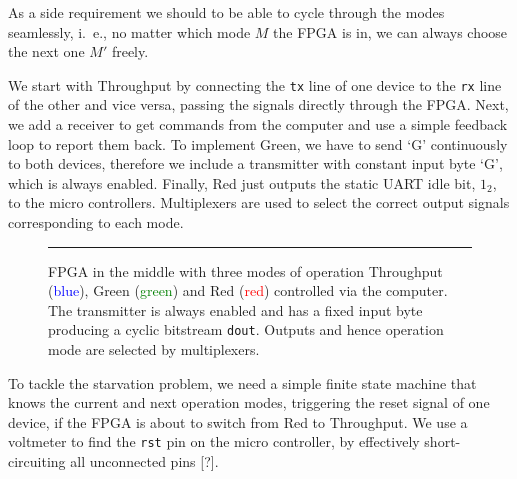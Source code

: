 As a side requirement we should to be able to cycle through the modes seamlessly, i.~e., no matter which mode $M$ the FPGA is in, we can always choose the next one $M'$ freely.

We start with \textsf{Throughput} by connecting the \texttt{tx} line of one device to the \texttt{rx} line of the other and vice versa, passing the signals directly through the FPGA. 
Next, we add a receiver to get commands from the computer and use a simple feedback loop to report them back. 
To implement \textsf{Green}, we have to send `G' continuously to both devices, therefore we include a transmitter with constant input byte `G', which is always enabled.
Finally, \textsf{Red} just outputs the static UART idle bit, $1_2$, to the micro controllers. 
Multiplexers are used to select the correct output signals corresponding to each mode. 

\begin{figure}[tb]
    \begin{center}
        
        \caption{FPGA in the middle with three modes of operation \textsf{Throughput} (\textcolor{blue}{blue}), \textsf{Green} (\textcolor{green}{green}) and \textsf{Red} (\textcolor{red}{red}) controlled via the computer. The transmitter is always enabled and has a fixed input byte producing a cyclic bitstream \texttt{dout}. Outputs and hence operation mode are selected by multiplexers.}
        \label{fig:as3-schematic}
        \vspace{1em}\hrule
    \end{center}
\end{figure}

To tackle the starvation problem, we need a simple finite state machine that knows the current and next operation modes, triggering the reset signal of one device, if the FPGA is about to switch from \textsf{Red} to \textsf{Throughput}. We use a voltmeter to find the \texttt{rst} pin on the micro controller, by effectively short-circuiting all unconnected pins [?].
